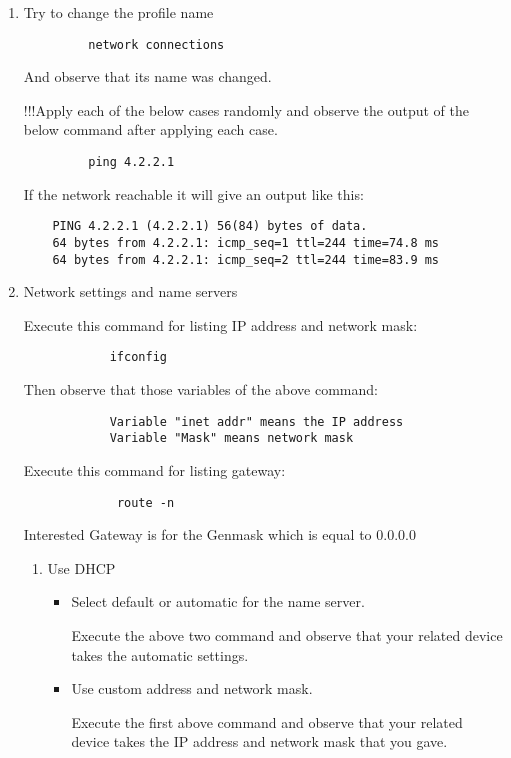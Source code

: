 \documentclass[a4paper,10pt]{article}
\begin{document}
\begin{enumerate}
\begin{enumerate}
	  \item Try to change the profile name
	    \begin{verbatim}
	     network connections
	    \end{verbatim}
	    And observe that its name was changed.

	\newpage    
    !!!Apply each of the below cases randomly and observe the output of the below command after applying each case.
		\begin{verbatim}
		 ping 4.2.2.1
		\end{verbatim}
	If the network reachable it will give an output like this:
	\begin{verbatim}
	PING 4.2.2.1 (4.2.2.1) 56(84) bytes of data.
	64 bytes from 4.2.2.1: icmp_seq=1 ttl=244 time=74.8 ms
	64 bytes from 4.2.2.1: icmp_seq=2 ttl=244 time=83.9 ms
      	\end{verbatim}

	  \item Network settings and name servers

	    Execute this command for listing IP address and network mask:
		  \begin{verbatim}
		    ifconfig
		  \end{verbatim}
	   Then observe that those variables of the above command:
		   \begin{verbatim}
		    Variable "inet addr" means the IP address
		    Variable "Mask" means network mask
		  \end{verbatim}
	   Execute this command for listing gateway:
	    	   \begin{verbatim}
		     route -n 
		  \end{verbatim}
	   Interested Gateway is for the Genmask which is equal to 0.0.0.0

	      \begin{enumerate} 
	      \item Use DHCP
		\begin{itemize}
		  \item Select default or automatic for the name server.
				      
		   Execute the above two command and observe that your related device takes the automatic settings. 

		  \item Use custom address and network mask. 
		
		   Execute the first above command and observe that your related device takes the IP address and network mask that you gave.
  

\end{itemize}
\end{enumerate}
\end{enumerate}
\end{enumerate}
\end{document}
